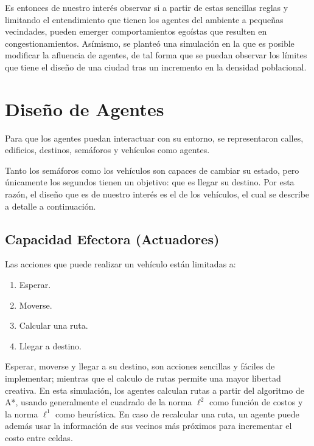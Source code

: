 \documentclass[twoside,11pt]{article}
\begin{document}
Es entonces de nuestro interés observar si a partir de estas sencillas reglas y limitando el entendimiento 
que tienen los agentes del ambiente a pequeñas vecindades, pueden emerger comportamientos egoístas que resulten
en congestionamientos. Asímismo, se planteó una simulación en la que es posible modificar la afluencia de agentes,
de tal forma que se puedan observar los límites que tiene el diseño de una ciudad tras un incremento en la densidad
poblacional.

\section{Diseño de Agentes}

Para que los agentes puedan interactuar con su entorno, se representaron calles, edificios, destinos, semáforos y vehículos
como agentes.

Tanto los semáforos como los vehículos son capaces de cambiar su estado, pero únicamente los segundos tienen
un objetivo: que es llegar su destino. Por esta razón, el diseño que es de nuestro interés es el de los vehículos, el cual
se describe a detalle a continuación.

\subsection{Capacidad Efectora (Actuadores)}

Las acciones que puede realizar un vehículo están limitadas a:

\begin{enumerate}
    \item Esperar.
    
    \item Moverse.

    \item Calcular una ruta.

    \item Llegar a destino.
\end{enumerate}

Esperar, moverse y llegar a su destino, son acciones sencillas y fáciles
de implementar; mientras que el calculo de rutas permite una mayor libertad
creativa. En esta simulación, los agentes calculan rutas a partir del algoritmo 
de A*, usando generalmente el cuadrado de la norma $\ell^{2}$ como función de costos y 
la norma $\ell^{1}$ como heurística. En caso de recalcular una ruta, un agente puede
además usar la información de sus vecinos más próximos para incrementar el costo
entre celdas.
\end{document}
